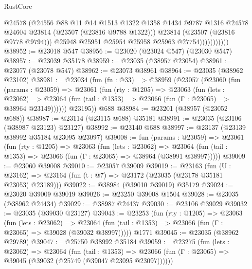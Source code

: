 \begin{lexlean}{RustCore}
\begin{coremodule}
                            @24578
                            (@24556
                              @88
                              @11
                              @14
                              @1513
                              @1322
                              @1358
                              @1434
                              @9787
                              @1316
                              @24578
                              @24604
                              @23814
                              (@23507 (@23816 @9788 @1322)))
                            @23814
                            (@23507 (@23816 @9778 @9794)))
                          @25948
                          @25951
                          @25954
                          @25958
                          @25963
                          @27754)))))))))))
@38952 := @23018 @547
@38956 := @23020 (@23024 @547) (@23030 @547)
@38957 := @23039 @35178
@38959 := @23035 (@38957 @23054)
@38961 := @23077 (@23078 @547)
@38962 := @23073 @38961
@38964 := @23035 (@38962 @23102)
@38981 := @23034
    (fun (fn : @33) =>
    @38959
      (@23057
        (@23060
          (fun (params : @23059) =>
          @23061
            (fun (rty : @1205) =>
            @23063
              (fun (lets : @23062) =>
              @23064 (fun (tail : @1353) => @23066 (fun (Γ : @23065) => @38964 @23149))))))
        @23195))
    @688
@38984 := @23201 (@38957 (@23052 @688))
@38987 := @23114 (@23115 @688) @35181
@38991 := @23035 (@23106 (@38987 @23123) @23127)
@38992 := @23140 @688
@38997 := @23137 (@23139 @38992 @35184 @23095 @23097)
@39008 := fun (params : @23059) =>
  @23061
    (fun (rty : @1205) =>
    @23063
      (fun (lets : @23062) =>
      @23064 (fun (tail : @1353) => @23066 (fun (Γ : @23065) => @38964 (@38991 @38997)))))
@39009 := @23060 @39008
@39010 := @23057 @39009
@39019 := @23163
    (fun (U : @23162) => @23164 (fun (t : @7) => @23172 (@23035 (@23178 @35181 @23053) @23189)))
@39022 := @38984 (@39010 @39019) @35179
@39024 := @23020 @39009 @39019
@39026 := @23250 @39008 @1504
@39028 := @23035 (@38962 @24434)
@39029 := @38987 @24437
@39030 := @23106 @39029
@39032 := @23035 (@39030 @23127)
@39043 := @23253
    (fun (rty : @1205) =>
    @23063
      (fun (lets : @23062) =>
      @23064 (fun (tail : @1353) => @23066 (fun (Γ : @23065) => @39028 (@39032 @38997)))))
    @1771
@39045 := @23035 (@38962 @29789)
@39047 := @25750 @38992 @35184
@39059 := @23275
    (fun (lets : @23062) =>
    @23064
      (fun (tail : @1353) =>
      @23066 (fun (Γ : @23065) => @39045 (@39032 (@25749 (@39047 @23095 @23097))))))

\end{coremodule}
\end{lexlean}
